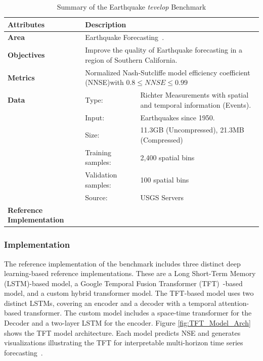 \documentclass[utf8]{FrontiersinVancouver} %
\begin{document}
\begin{table}
\caption{Summary of the Earthquake {\em tevelop} Benchmark}\label{tab:eq-summary}
\begin{center}
  {\footnotesize
\begin{tabular}{|p{}p{}p{}|}
\hline
{\bf Attributes} & {\bf Description} \\
\hline
\hline
{\bf Area} & \multicolumn{2}{l|}{Earthquake Forecasting~\citep{fox2022-jm,TFT-21,eq-code,eq-data}.}\\
\hline
{\bf Objectives} &  \multicolumn{2}{l|}{Improve the quality of Earthquake
forecasting in a region of Southern California.}\\
\hline
{\bf Metrics} & \multicolumn{2}{l|}{Normalized Nash-Sutcliffe model efficiency coefficient (NNSE)with $0.8\leq NNSE\leq 0.99$}\\
\hline
{\bf Data}  & Type:  & Richter Measurements with spatial and temporal information (Events). \\
  &  Input:  & Earthquakes since 1950.\\
  &  Size:  & 11.3GB (Uncompressed), 21.3MB (Compressed)\\
  & Training samples: & 2,400 spatial bins\\
  & Validation samples:  &  100 spatial bins\\
  & Source:  & USGS Servers~\citep{eq-data}\\
\hline
{\bf Reference Implementation} & \citep{eq-code} & \\
\hline
\end{tabular}
}
\end{center}
\end{table}


\subsubsection{Implementation}

The reference implementation of the benchmark includes three distinct
deep learning-based reference implementations. These are a Long
Short-Term Memory (LSTM)-based model, a Google Temporal Fusion
Transformer (TFT)~\citep{TFT-21}-based model, and a custom hybrid
transformer model. The TFT-based model uses two distinct LSTMs,
covering an encoder and a decoder with a temporal attention-based
transformer. The custom model includes a space-time transformer for
the Decoder and a two-layer LSTM for the encoder. Figure
\ref{fig:TFT_Model_Arch} shows the TFT model architecture. Each model
predicts NSE and generates visualizations illustrating the TFT for
interpretable multi-horizon time series forecasting~\citep{TFT-21}.
\end{document}
